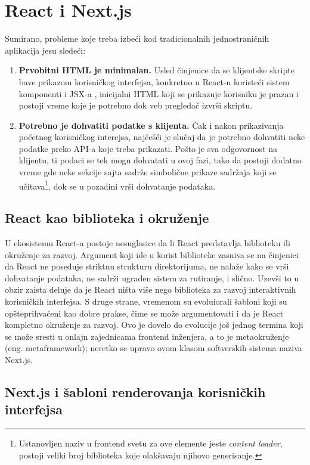 \documentclass[12pt,oneside]{memoir}
\begin{document}
\section{React i Next.js}
Sumirano, probleme koje treba izbeći kod tradicionalnih jednostraničnih aplikacija jesu sledeći:
\begin{enumerate}
    \item \textbf{Prvobitni HTML je minimalan.} Usled činjenice da se klijentske skripte bave prikazom korisničkog interfejsa, konkretno u React-u koristeći sistem komponenti i JSX-a \cite{reactdocscomponents}, inicijalni HTML koji se prikazuje korisniku je prazan i postoji vreme koje je potrebno dok veb pregledač izvrši skriptu.
    \item \textbf{Potrebno je dohvatiti podatke s klijenta.} Čak i nakon prikazivanja početnog korisničkog interejsa, najčešći je slučaj da je potrebno dohvatiti neke podatke preko API-a koje treba prikazati. Pošto je sva odgovornost na klijentu, ti podaci se tek mogu dohvatati u ovoj fazi, tako da postoji dodatno vreme gde neke sekcije sajta sadrže simbolične prikaze sadržaja koji se učitava\footnote{Ustanovljen naziv u frontend svetu za ove elemente jeste \textit{content loader}, postoji veliki broj biblioteka koje olakšavaju njihovo generisanje.}, dok se u pozadini vrši dohvatanje podataka.
\end{enumerate}

\subsection{React kao biblioteka i okruženje}

U ekosistemu React-a postoje nesuglasice da li React predstavlja biblioteku ili okruženje za razvoj. Argument koji ide u korist biblioteke zasniva se na činjenici da React ne poseduje striktnu strukturu direktorijuma, ne nalaže kako se vrši dohvatanje podataka, ne sadrži ugrađen sistem za rutiranje, i slično. Uzevši to u obzir zaista deluje da je React ništa više nego biblioteka za razvoj interaktivnih korisničkih interfejsa. S druge strane, vremenom su evoluiorali šabloni koji su opšteprihvaćeni kao dobre prakse, čime se može argumentovati i da je React kompletno okruženje za razvoj. Ovo je dovelo do evolucije još jednog termina koji se može sresti u onlajn zajednicama frontend inženjera, a to je metaokruženje (eng. metaframework); neretko se upravo ovom klasom softverskih sistema naziva Next.js.

\subsection{Next.js i šabloni renderovanja korisničkih interfejsa}
\end{document}
